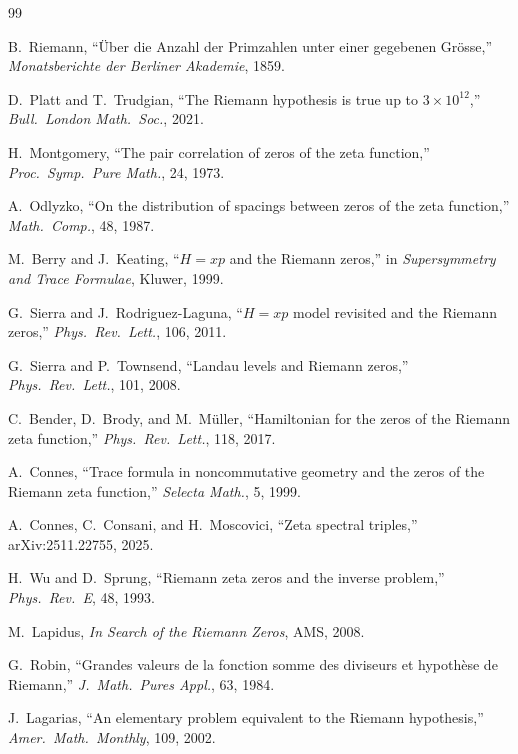 \documentclass[11pt]{article}
\begin{document}
\begin{thebibliography}{99}

B.~Riemann, ``\"Uber die Anzahl der Primzahlen unter einer gegebenen Gr\"osse,''
\textit{Monatsberichte der Berliner Akademie}, 1859.

D.~Platt and T.~Trudgian, ``The Riemann hypothesis is true up to $3 \times 10^{12}$,''
\textit{Bull.\ London Math.\ Soc.}, 2021.

H.~Montgomery, ``The pair correlation of zeros of the zeta function,''
\textit{Proc.\ Symp.\ Pure Math.}, 24, 1973.

A.~Odlyzko, ``On the distribution of spacings between zeros of the zeta function,''
\textit{Math.\ Comp.}, 48, 1987.

M.~Berry and J.~Keating, ``$H = xp$ and the Riemann zeros,''
in \textit{Supersymmetry and Trace Formulae}, Kluwer, 1999.

G.~Sierra and J.~Rodriguez-Laguna, ``$H = xp$ model revisited and the Riemann zeros,''
\textit{Phys.\ Rev.\ Lett.}, 106, 2011.

G.~Sierra and P.~Townsend, ``Landau levels and Riemann zeros,''
\textit{Phys.\ Rev.\ Lett.}, 101, 2008.

C.~Bender, D.~Brody, and M.~M\"uller, ``Hamiltonian for the zeros of the Riemann zeta function,''
\textit{Phys.\ Rev.\ Lett.}, 118, 2017.

A.~Connes, ``Trace formula in noncommutative geometry and the zeros of the Riemann zeta function,''
\textit{Selecta Math.}, 5, 1999.

A.~Connes, C.~Consani, and H.~Moscovici, ``Zeta spectral triples,''
arXiv:2511.22755, 2025.

H.~Wu and D.~Sprung, ``Riemann zeta zeros and the inverse problem,''
\textit{Phys.\ Rev.\ E}, 48, 1993.

M.~Lapidus, \textit{In Search of the Riemann Zeros}, AMS, 2008.

G.~Robin, ``Grandes valeurs de la fonction somme des diviseurs et hypoth\`ese de Riemann,''
\textit{J.\ Math.\ Pures Appl.}, 63, 1984.

J.~Lagarias, ``An elementary problem equivalent to the Riemann hypothesis,''
\textit{Amer.\ Math.\ Monthly}, 109, 2002.


\end{thebibliography}
\end{document}
